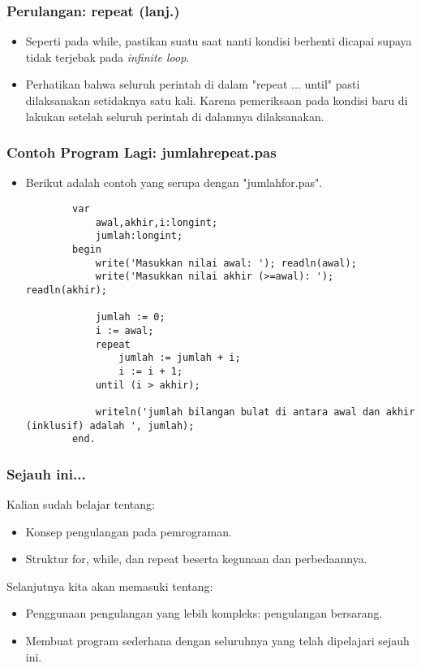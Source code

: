 \documentclass{beamer}
\begin{document}
\begin{frame}
\frametitle{Perulangan: repeat (lanj.)}
\begin{itemize}
	\item Seperti pada while, pastikan suatu saat nanti kondisi berhenti dicapai supaya tidak terjebak pada \textit{infinite loop}.
	\item Perhatikan bahwa seluruh perintah di dalam "repeat ... until" \alert{pasti} dilaksanakan setidaknya satu kali. Karena pemeriksaan pada kondisi baru di lakukan setelah seluruh perintah di dalamnya dilaksanakan. 
\end{itemize}
\end{frame}

\begin{frame}[fragile]
\frametitle{Contoh Program Lagi: jumlahrepeat.pas}
\begin{itemize}
	\item Berikut adalah contoh yang serupa dengan "jumlahfor.pas".
	\begin{lstlisting}
		var
		    awal,akhir,i:longint;
		    jumlah:longint;
		begin
		    write('Masukkan nilai awal: '); readln(awal);
		    write('Masukkan nilai akhir (>=awal): '); readln(akhir);
		
		    jumlah := 0;
		    i := awal;
		    repeat
		        jumlah := jumlah + i;
		        i := i + 1;
		    until (i > akhir);
		
		    writeln('jumlah bilangan bulat di antara awal dan akhir (inklusif) adalah ', jumlah);
		end.
	\end{lstlisting}
\end{itemize}
\end{frame}

\begin{frame}
\frametitle{Sejauh ini...}
Kalian sudah belajar tentang:
\begin{itemize}
	\item Konsep pengulangan pada pemrograman.
	\item Struktur for, while, dan repeat beserta kegunaan dan perbedaannya.
\end{itemize}
Selanjutnya kita akan memasuki tentang:
\begin{itemize}
	\item Penggunaan pengulangan yang lebih kompleks: pengulangan bersarang.
	\item Membuat program sederhana dengan seluruhnya yang telah dipelajari sejauh ini.
\end{itemize}
\end{frame}
\end{document}
